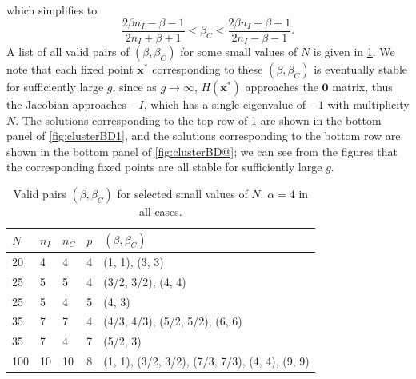 \documentclass[reqno]{siamonline190516}
\newcommand{\xvec}{\mathbf{x}}
\newcommand{\Zerovec}{\mathbf{0}}
\begin{document}
which simplifies to 
\begin{equation}
    \frac{2 \beta n_I - \beta - 1}{2 n_I + \beta + 1} < \beta_C < \frac{2 \beta n_I + \beta + 1}{2 n_I - \beta - 1}.
\end{equation}
A list of all valid pairs of $(\beta, \beta_C)$ for some small values of $N$ is given in \cref{table:validbeta}. We note that each fixed point $\xvec^*$ corresponding to these $(\beta, \beta_C)$ is eventually stable for sufficiently large $g$, since as $g\rightarrow \infty$, $H(\xvec^*)$ approaches the $\Zerovec$ matrix, thus the Jacobian approaches $-I$, which has a single eigenvalue of $-1$ with multiplicity $N$. The solutions corresponding to the top row of \cref{table:validbeta} are shown in the bottom panel of \cref{fig:clusterBD1}, and the solutions corresponding to the bottom row are shown in the bottom panel of \cref{fig:clusterBD@}; we can see from the figures that the corresponding fixed points are all stable for sufficiently large $g$.

\begin{table}
\centering
    \begin{tabular}{lllll}
        \toprule
        $N$ & $n_I$ & $n_C$ & $p$ & $(\beta, \beta_C)$ \\
        \midrule
        20 & 4 & 4 & 4 & (1, 1), (3, 3) \\
        25 & 5 & 5 & 4 & (3/2, 3/2), (4, 4) \\
        25 & 5 & 4 & 5 & (4, 3) \\
        35 & 7 & 7 & 4 & (4/3, 4/3), (5/2, 5/2), (6, 6) \\
        35 & 7 & 4 & 7 & (5/2, 3) \\
        100 & 10 & 10 & 8 & (1, 1), (3/2, 3/2), (7/3, 7/3), (4, 4), (9, 9) \\
        \bottomrule
    \end{tabular}
    \vspace{0.25cm}
    \caption{Valid pairs $(\beta, \beta_C)$ for selected small values of $N$. $\alpha = 4$ in all cases.}
    \label{table:validbeta}
\end{table}
\end{document}
